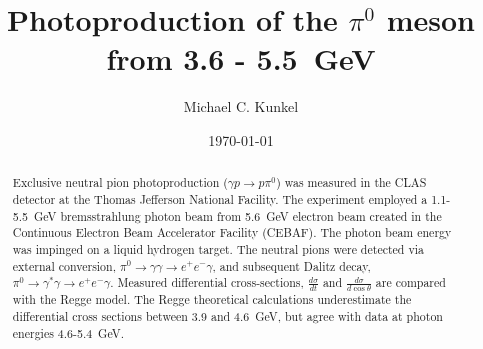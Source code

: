 \documentclass[%
 reprint,
showpacs,
 amsmath,amssymb,
 aps,
]{revtex4-1}
\begin{document}

\title{Photoproduction of the $\pi^0$ meson from 3.6 - 5.5~GeV }%

\author{Michael C. Kunkel}
%


%

\date{\today}%

\begin{abstract}
Exclusive neutral pion photoproduction ($\gamma p \rightarrow p \pi^0$) was measured in the CLAS detector at the Thomas Jefferson National Facility. The experiment employed a 1.1-5.5~GeV bremsstrahlung photon beam from 5.6~GeV electron beam created in the Continuous Electron Beam Accelerator Facility (CEBAF). The photon beam energy was impinged on a liquid hydrogen target. The neutral pions were detected via external conversion, $\pi^0 \rightarrow \gamma \gamma \rightarrow e^+e^-\gamma$, and subsequent Dalitz decay, $\pi^0 \rightarrow \gamma^* \gamma \rightarrow e^+e^-\gamma$. Measured differential cross-sections, $\frac{d\sigma}{dt}$ and $\frac{d\sigma}{d\cos \theta}$ are compared with the Regge model. The Regge theoretical calculations underestimate the differential cross sections between 3.9 and 4.6~GeV, but agree with data at photon energies 4.6-5.4~GeV.

\end{abstract}
\end{document}
